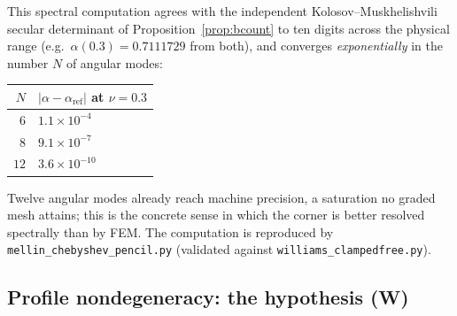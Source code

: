 This spectral computation agrees with the independent Kolosov--Muskhelishvili secular determinant of
Proposition~\ref{prop:bcount} to ten digits across the physical range (e.g.\ $\alpha(0.3)=0.7111729$ from both), and
converges \emph{exponentially} in the number $N$ of angular modes:
\begin{center}
    \begin{tabular}{rl}
        \toprule
        $N$ & $|\alpha-\alpha_{\mathrm{ref}}|$ at $\nu=0.3$ \\
        \midrule
        $6$  & $1.1\times10^{-4}$ \\
        $8$  & $9.1\times10^{-7}$ \\
        $12$ & $3.6\times10^{-10}$ \\
        \bottomrule
    \end{tabular}
\end{center}
Twelve angular modes already reach machine precision, a saturation no graded mesh attains; this is the concrete sense in
which the corner is better resolved spectrally than by FEM. The computation is reproduced by
\texttt{mellin\_chebyshev\_pencil.py} (validated against \texttt{williams\_clampedfree.py}).

\subsection{Profile nondegeneracy: the hypothesis (W)}
\label{sub:numW}

